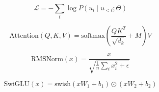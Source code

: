 
\begin{equation}
\mathcal{L} = -\sum_{i} \log P(u_i \mid u_{<i}; \Theta)
\end{equation}

\begin{equation}
\text{Attention}(Q, K, V) = \text{softmax}\left( \frac{QK^T}{\sqrt{d_k}} + M \right) V
\end{equation}

\begin{equation}
\text{RMSNorm}(x) = \frac{x}{\sqrt{\frac{1}{n} \sum_i x_i^2 + \epsilon}}
\end{equation}

\begin{equation}
\text{SwiGLU}(x) = \text{swish}(x W_1 + b_1) \odot (x W_2 + b_2)
\end{equation}